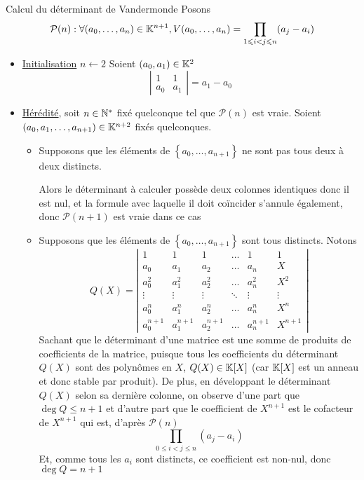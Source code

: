 \documentclass{article}
\begin{document}
\begin{question_kholle}{Calcul du déterminant de Vandermonde}
Posons
    $$
\mathcal{P}(n) : \forall (a_{0},\dots,a_{n}) \in \mathbb K^{n+1}, V(a_{0}, \dots, a_{n}) = \prod_{1\leqslant i < j \leqslant n}(a_{j} - a_{i})
$$
\begin{itemize}[label=$\lozenge$]
    \item \underline{Initialisation} $n \leftarrow 2$
Soient $(a_{0}, a_{1}) \in \mathbb K^{2}$
$$
\left| \begin{matrix}
1 & 1 \\
a_{0} & a_{1}
\end{matrix}\right| = a_{1} - a_{0}
$$



\item \underline{Hérédité}, soit $n \in \mathbb N^{*}$ fixé quelconque tel que $\mathcal{P}(n)$ est vraie.
Soient $(a_{0}, a_{1}, \dots, a_{n+1}) \in \mathbb K^{n+2}$ fixés quelconques.
\begin{itemize}
    \item Supposons que les éléments de $\left\{ a_{0}, \dots, a_{n+1} \right\}$ ne sont pas tous deux à deux distincts.
    
    Alors le déterminant à calculer possède deux colonnes identiques donc il est nul, et la formule avec laquelle il doit coïncider s'annule également, donc $\mathcal{P}(n+1)$ est vraie dans ce cas

    \item Supposons que les éléments de $\left\{ a_{0} ,\dots, a_{n+1} \right\}$ sont tous distincts.
Notons
$$
Q(X) = \left| \begin{matrix}
1 & 1 & 1 & \dots  & 1 & 1 \\
a_{0} & a_{1} & a_{2} & \dots & a_{n} & X \\
a_{0}^{2} & a_{1}^{2} & a_{2}^{2} & \dots & a_{n}^{2} & X^{2} \\
\vdots & \vdots & \vdots & \ddots & \vdots & \vdots \\
a_{0}^{n} & a_{1}^{n} & a_{2}^{n} & \dots & a_{n}^{n} & X^{n} \\
a_{0}^{n+1} & a_{1}^{n+1} & a_{2}^{n+1} & \dots & a_{n}^{n+1} & X^{n+1}
\end{matrix} \right| 
$$
Sachant que le déterminant d'une matrice est une somme de produits de coefficients de la matrice, puisque tous les coefficients du déterminant $Q(X)$ sont des polynômes en $X$, $Q(X) \in \mathbb K[X]$ (car $\mathbb K[X]$ est un anneau et donc stable par produit).
De plus, en développant le déterminant $Q(X)$ selon sa dernière colonne, on observe d'une part que $\deg Q \leqslant n+1$ et d'autre part que le coefficient de $X^{n+1}$ est le cofacteur de $X^{n+1}$ qui est, d'après $\mathcal{P}(n)$
$$
\prod_{0\leqslant i<j \leqslant n}(a_{j}-a_{i})
$$
Et, comme tous les $a_{i}$ sont distincts, ce coefficient est non-nul, donc $\deg Q=n+1$


\end{itemize}
\end{itemize}
\end{question_kholle}
\end{document}
